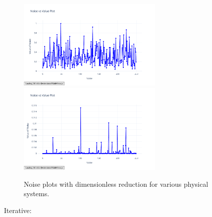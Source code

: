 \documentclass{article}
\begin{document}
\begin{figure}[H]
    \includegraphics[width=7cm]{noise_Rutherford_d_r}
    \includegraphics[width=7cm]{noise_Simple_Harmonic_Motion_d_r}
    \caption{Noise plots with dimensionless reduction for various physical systems.}
    \label{fig:noise_dimless_plots}
\end{figure}




Iterative: \\
\end{document}
